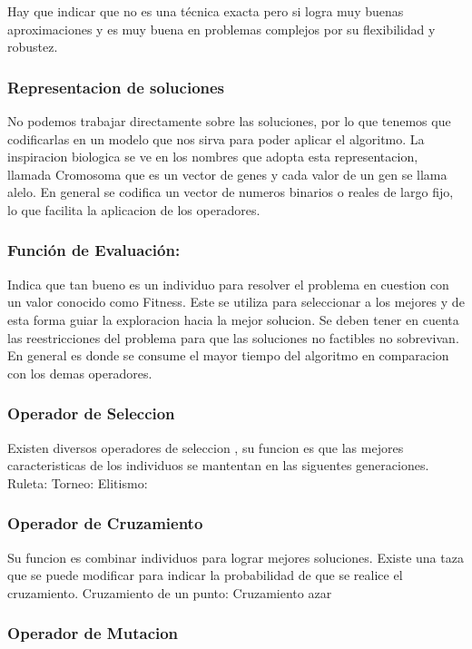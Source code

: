 Hay que indicar que no es una técnica exacta pero si logra muy buenas aproximaciones y es muy buena en problemas complejos por su flexibilidad y robustez. 


\subsubsection{Representacion de soluciones}
No podemos trabajar directamente sobre las soluciones, por lo que tenemos que codificarlas en un modelo que nos sirva para poder aplicar el algoritmo.
La inspiracion biologica se ve en los nombres que adopta esta representacion, llamada Cromosoma que es un vector de genes y cada valor de un gen se llama alelo.
En general se codifica un vector de numeros binarios o reales de largo fijo, lo que facilita la aplicacion de los operadores.

\subsubsection{Función de Evaluación:} 
Indica que tan bueno es un individuo para resolver el problema en cuestion con un valor conocido como Fitness. Este se utiliza para seleccionar a los mejores y de esta forma guiar la exploracion hacia la mejor solucion.
Se deben tener en cuenta las reestricciones del problema para que las soluciones no factibles no sobrevivan.
En general es donde se consume el mayor tiempo del algoritmo en comparacion con los demas operadores.

\subsubsection{Operador de Seleccion}
Existen diversos operadores de seleccion , su funcion es que las mejores caracteristicas de los individuos se mantentan en las siguentes generaciones.
Ruleta:
Torneo:
Elitismo:

\subsubsection{Operador de Cruzamiento}
Su funcion es combinar individuos para lograr mejores soluciones. 
Existe una taza que se puede modificar para indicar la probabilidad de que se realice el cruzamiento.
Cruzamiento de un punto:
Cruzamiento azar

\subsubsection{Operador de Mutacion}


